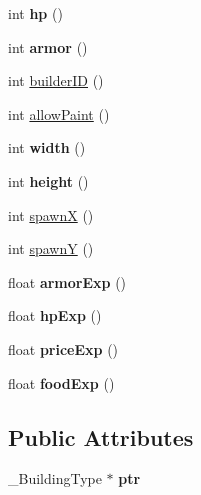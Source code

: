 \begin{CompactItemize}
\item 
\hypertarget{classBuildingType_0782b2e15502434e037a3ab568cda60a}{
int \textbf{hp} ()}
\label{classBuildingType_0782b2e15502434e037a3ab568cda60a}

\item 
\hypertarget{classBuildingType_58e99303826f46d4cf1aa15d554f196c}{
int \textbf{armor} ()}
\label{classBuildingType_58e99303826f46d4cf1aa15d554f196c}

\item 
int \hyperlink{classBuildingType_2345e1ed48eef3ece1fab1a49a5d156c}{builderID} ()
\item 
int \hyperlink{classBuildingType_dd762a4123302708815b67c11b8029df}{allowPaint} ()
\item 
\hypertarget{classBuildingType_06da51d3d6a345f5e69f7c845a6f60e6}{
int \textbf{width} ()}
\label{classBuildingType_06da51d3d6a345f5e69f7c845a6f60e6}

\item 
\hypertarget{classBuildingType_f4dced7299e2e310f6f1ed4650b599ee}{
int \textbf{height} ()}
\label{classBuildingType_f4dced7299e2e310f6f1ed4650b599ee}

\item 
int \hyperlink{classBuildingType_af7eafec053a2235e0bd59867735cb38}{spawnX} ()
\item 
int \hyperlink{classBuildingType_2eb4a10f9714a1947b33354a7eb59d5d}{spawnY} ()
\item 
\hypertarget{classBuildingType_ac4e7a40274f1384fbb6bed347817dc3}{
float \textbf{armorExp} ()}
\label{classBuildingType_ac4e7a40274f1384fbb6bed347817dc3}

\item 
\hypertarget{classBuildingType_6ff19209c80c182f0f1efcdfc5832f77}{
float \textbf{hpExp} ()}
\label{classBuildingType_6ff19209c80c182f0f1efcdfc5832f77}

\item 
\hypertarget{classBuildingType_7680b2d1f0fe070e47c7a0e0637437d1}{
float \textbf{priceExp} ()}
\label{classBuildingType_7680b2d1f0fe070e47c7a0e0637437d1}

\item 
\hypertarget{classBuildingType_c3f36af02351f9a2f020bbf31c787518}{
float \textbf{foodExp} ()}
\label{classBuildingType_c3f36af02351f9a2f020bbf31c787518}

\end{CompactItemize}
\subsection*{Public Attributes}
\begin{CompactItemize}
\item 
\hypertarget{classBuildingType_f3ec5eaf1c1ccfdc72250183dbaa38e3}{
\_\-BuildingType $\ast$ \textbf{ptr}}
\label{classBuildingType_f3ec5eaf1c1ccfdc72250183dbaa38e3}

\end{CompactItemize}
